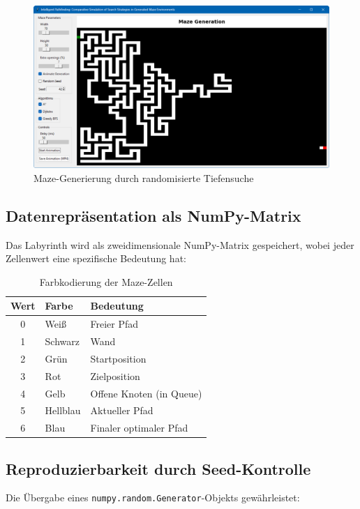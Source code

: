 \documentclass[12pt,a4paper]{article}
\begin{document}
\begin{figure}[H]
\centering
\includegraphics[width=\textwidth]{maze.png}
\caption{Maze-Generierung durch randomisierte Tiefensuche}
\label{fig:maze}
\end{figure}


\subsection{Datenrepräsentation als NumPy-Matrix}

Das Labyrinth wird als zweidimensionale NumPy-Matrix gespeichert, wobei jeder Zellenwert eine spezifische Bedeutung hat:

\begin{table}[H]
\centering
\begin{tabular}{cll}
\toprule
\textbf{Wert} & \textbf{Farbe} & \textbf{Bedeutung} \\
\midrule
0 & Weiß & Freier Pfad \\
1 & Schwarz & Wand \\
2 & Grün & Startposition \\
3 & Rot & Zielposition \\
4 & Gelb & Offene Knoten (in Queue) \\
5 & Hellblau & Aktueller Pfad \\
6 & Blau & Finaler optimaler Pfad \\
\bottomrule
\end{tabular}
\caption{Farbkodierung der Maze-Zellen}
\end{table}

\subsection{Reproduzierbarkeit durch Seed-Kontrolle}

Die Übergabe eines \texttt{numpy.random.Generator}-Objekts gewährleistet:
\end{document}
